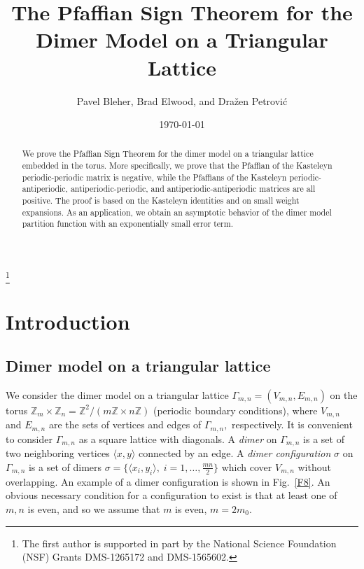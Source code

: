 \documentclass[12pt,reqno]{amsart}
\numberwithin{equation}{section}
\newcommand{\Z}{{\mathbb Z}}
\newcommand{\Ga}{\Gamma}
\newcommand{\sg}{\sigma}
\begin{document}
\title[The Pfaffian Sign Theorem for the Dimer Model on a Triangular Lattice]
{The Pfaffian Sign Theorem for the Dimer Model on a Triangular Lattice}

\author{Pavel Bleher, Brad Elwood, and Dra\v zen Petrovi\'c}

\date{\today}


\thanks{The first author is supported in part
by the National Science Foundation (NSF) Grants DMS-1265172 and DMS-1565602.}


\begin{abstract}
We prove the Pfaffian Sign Theorem for the dimer model on a triangular lattice embedded in the torus. More specifically, we prove that the Pfaffian of the Kasteleyn periodic-periodic matrix is negative, while the Pfaffians of the Kasteleyn periodic-antiperiodic, antiperiodic-periodic, and antiperiodic-antiperiodic matrices are all positive. The proof is based on the Kasteleyn identities and on small weight expansions. As an application, we obtain an asymptotic behavior of the dimer model partition function with an exponentially small error term.
\end{abstract}

\maketitle

\section{Introduction}

\subsection{Dimer model on a triangular lattice}

We consider the dimer model on a triangular lattice $\Gamma_{m,n}=(V_{m,n},E_{m,n})$ on the torus $\Z_m\times \Z_n=\Z^2/(m\Z\times n\Z)$ (periodic boundary conditions), where
$V_{m,n}$ and $E_{m,n}$ are the sets of vertices and edges of $\Gamma_{m,n},$ respectively. It is convenient to consider $\Gamma_{m,n}$ as a square lattice with diagonals. 
A \textit{dimer} on $\Gamma_{m,n}$ is a set of two neighboring vertices $\langle x,y\rangle$ connected by an edge. 
A \textit{dimer configuration} $\sg$ on $\Ga_{m,n}$ is a set of dimers $\sg=\{\langle x_i,y_i\rangle,\;i=1,\ldots,\frac{mn}{2}\}$ which cover $V_{m,n}$ without overlapping. 
An example of a dimer configuration is shown in Fig.\ \ref{F8}. An obvious necessary condition for a configuration to exist is that at least one of $m,n$ is even, and so we assume that $m$ is even, $m=2m_0$.
\end{document}
